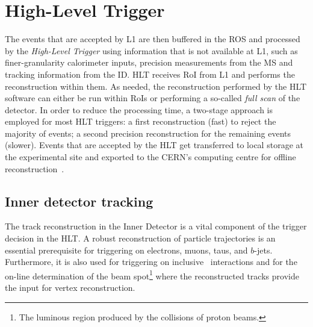 		

			


	\section{High-Level Trigger}
	\label{sec:HLT}

		The events that are accepted by \ac{L1} are then buffered in the \ac{ROS} and processed by the \emph{High-Level Trigger} using information that is not available at \ac{L1}, such as finer-granularity calorimeter inputs, precision measurements from the \ac{MS} and tracking information from the \ac{ID}. \ac{HLT} receives \ac{RoI} from \ac{L1} and performs the reconstruction within them. As needed, the reconstruction performed by the \ac{HLT} software can either be run within \ac{RoI}s or performing a so-called \emph{full scan} of the detector. In order to reduce the processing time, a two-stage approach is employed for most \ac{HLT} triggers: a first reconstruction (fast) to reject the majority of events; a second precision reconstruction for the remaining events (slower). Events that are accepted by the \ac{HLT} get transferred to local storage at the experimental site and exported to the \ac{CERN}’s computing centre for offline reconstruction~\cite{ATLASTrigger2015}. 

		
		\subsection{Inner detector tracking}
		\label{sec:tracking}

			The track reconstruction in the Inner Detector is a vital component of the trigger decision in the \ac{HLT}. A robust reconstruction of particle trajectories is an essential prerequisite for triggering on electrons, muons, taus, and $b$-jets. Furthermore, it is also used for triggering on inclusive \pp\ interactions and for the on-line determination of the beam spot\footnote{The luminous region produced by the collisions of proton beams.} where the reconstructed tracks provide the input for vertex reconstruction.


